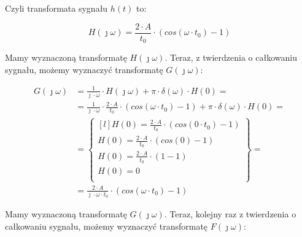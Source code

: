 \begin{task}
Czyli transformata sygnału $h(t)$ to:

\begin{equation}
H(\jmath \omega) = \frac{2 \cdot A}{t_{0}} \cdot \left(cos(\omega \cdot t_{0}) -1\right)
\end{equation}


Mamy wyznaczoną transformatę $H(\jmath \omega)$. Teraz, z twierdzenia o całkowaniu sygnału, możemy wyznaczyć transformatę $G(\jmath \omega)$:

\begin{align*}
G(\jmath \omega)&= \frac{1}{\jmath \cdot \omega} \cdot H(\jmath \omega) + \pi \cdot \delta(\omega) \cdot H(0)=\\
&=\frac{1}{\jmath \cdot \omega} \cdot \frac{2 \cdot A}{t_{0}} \cdot \left(cos(\omega \cdot t_{0}) -1\right)+ \pi \cdot \delta(\omega) \cdot H(0)=\\
&=\begin{Bmatrix*}[l]
H(0)=\frac{2 \cdot A}{t_{0}} \cdot \left(cos(0 \cdot t_{0}) -1\right)\\
H(0)=\frac{2 \cdot A}{t_{0}} \cdot \left(cos(0) -1\right)\\
H(0)=\frac{2 \cdot A}{t_{0}} \cdot \left(1 -1\right)\\
H(0)=0\\
\end{Bmatrix*}=\\
&=\frac{2 \cdot A}{\jmath \cdot \omega \cdot t_{0}} \cdot \left(cos(\omega \cdot t_{0}) -1\right)
\end{align*}




Mamy wyznaczoną transformatę $G(\jmath \omega)$. Teraz, kolejny raz z twierdzenia o całkowaniu sygnału, możemy wyznaczyć transformatę $F(\jmath \omega)$:


\end{task}
